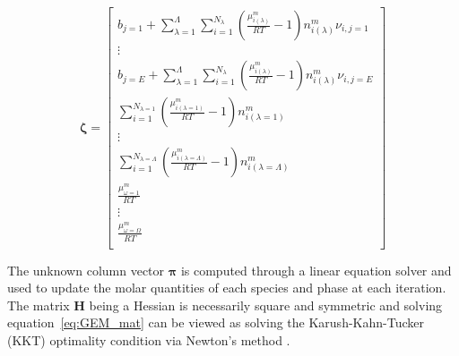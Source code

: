      \begin{equation}\label{eq:Constraint_mat}
        \boldsymbol{\zeta} = 
        \begin{bmatrix}
            b_{j=1} +  \sum_{\lambda=1}^{\Lambda} \sum_{i=1}^{N_\lambda} \left( \frac{\mu_{i(\lambda)}^{m}}{RT} -1 \right)n_{i(\lambda)}^{m} \nu_{i,j=1}\\
            \vdots \\
            b_{j=E} +  \sum_{\lambda=1}^{\Lambda} \sum_{i=1}^{N_\lambda} \left( \frac{\mu_{i(\lambda)}^{m}}{RT} -1 \right)n_{i(\lambda)}^{m} \nu_{i,j=E}\\
            \sum_{i=1}^{N_{\lambda=1}} \left( \frac{\mu_{i(\lambda=1)}^{m}}{RT} -1 \right)n_{i(\lambda=1)}^{m} \\
            \vdots \\
            \sum_{i=1}^{N_{\lambda=\Lambda}} \left( \frac{\mu_{i(\lambda=\Lambda)}^{m}}{RT} -1 \right)n_{i(\lambda=\Lambda)}^{m} \\
            \frac{\mu_{\omega=1}^{m}}{RT} \\
            \vdots\\
            \frac{\mu_{\omega=\Omega}^{m}}{RT} \\
        \end{bmatrix}
    \end{equation}

The unknown column vector $\boldsymbol{\pi}$ is computed through a linear equation solver and used to update the molar quantities of each species and phase at each  iteration. The matrix $\mathbf{H}$ being a Hessian is necessarily square and symmetric and solving equation~\eqref{eq:GEM_mat} can be viewed as solving the Karush-Kahn-Tucker (KKT) optimality condition via Newton's method \cite{Nocedal06}. 
